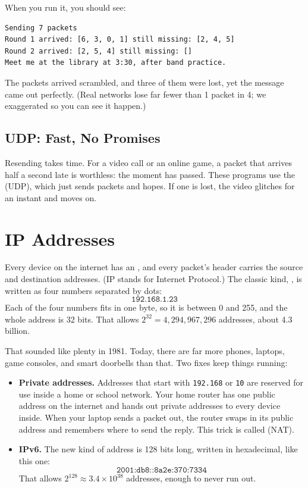 When you run it, you should see:
\begin{verbatim}
Sending 7 packets
Round 1 arrived: [6, 3, 0, 1] still missing: [2, 4, 5]
Round 2 arrived: [2, 5, 4] still missing: []
Meet me at the library at 3:30, after band practice.
\end{verbatim}

The packets arrived scrambled, and three of them were lost, yet the message came out perfectly. (Real
networks lose far fewer than 1 packet in 4; we exaggerated so you can see it happen.)

\subsection{UDP: Fast, No Promises}
Resending takes time. For a video call or an online game, a packet that arrives half a second late is
worthless: the moment has passed. These programs use the  (UDP), which just
sends packets and hopes. If one is lost, the video glitches for an instant and moves on.

\section{IP Addresses}
Every device on the internet has an , and every packet's header carries the source and
destination addresses. (IP stands for Internet Protocol.) The classic kind, , is written as
four numbers separated by dots:
$$\texttt{192.168.1.23}$$
Each of the four numbers fits in one byte, so it is between 0 and 255, and the whole address is 32 bits.
That allows $2^{32} = 4{,}294{,}967{,}296$ addresses, about 4.3 billion.

That sounded like plenty in 1981. Today, there are far more phones, laptops, game consoles, and smart
doorbells than that. Two fixes keep things running:
\begin{itemize}
\item \textbf{Private addresses.} Addresses that start with \verb|192.168| or \verb|10| are reserved for use
inside a home or school network. Your home router has one public address on the internet and hands out
private addresses to every device inside. When your laptop sends a packet out, the router swaps in its
public address and remembers where to send the reply. This trick is called  (NAT).
\item \textbf{IPv6.} The new kind of address is 128 bits long, written in hexadecimal, like
this one:
$$\texttt{2001:db8::8a2e:370:7334}$$
That allows $2^{128} \approx 3.4 \times 10^{38}$ addresses, enough to
never run out.
\end{itemize}

